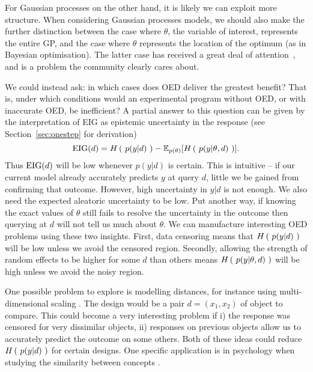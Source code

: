 For Gaussian processes on the other hand, it is likely we can exploit more structure. When considering Gaussian processes models, we should also make the further distinction between the case where $\theta$, the variable of interest, represents the entire GP, and the case where $\theta$ represents the location of the optimum (as in Bayesian optimisation). The latter case has received a great deal of attention~\cite{pes}, and is a problem the community clearly cares about.

We could instead ask: in which cases does OED deliver the greatest benefit? That is, under which conditions would an experimental program without OED, or with inaccurate OED, be inefficient? A partial answer to this question can be given by the interpretation of EIG as epistemic uncertainty in the response (see Section~\ref{sec:onestep} for derivation)
\begin{equation}
	\text{EIG}(d) = H\left(\ p(y|d)\ \right) - \mathbb{E}_{p(\theta)}[H\left(\ p(y|\theta,d)\ \right)].
\end{equation}
Thus $\text{EIG}(d)$ will be low whenever $p(y|d)$ is certain. This is intuitive -- if our current model already accurately predicts $y$ at query $d$, little we be gained from confirming that outcome. However, high uncertainty in $y|d$ is not enough. We also need the expected aleatoric uncertainty to be low. Put another way, if knowing the exact values of $\theta$ still fails to resolve the uncertainty in the outcome then querying at $d$ will not tell us much about $\theta$. We can manufacture interesting OED problems using these two insights. First, data censoring means that $H\left(\ p(y|d)\ \right)$ will be low unless we avoid the censored region. Secondly, allowing the strength of random effects to be higher for some $d$ than others means $H\left(\ p(y|\theta,d)\ \right)$ will be high unless we avoid the noisy region.

One possible problem to explore is modelling distances, for instance using multi-dimensional scaling \cite{torgerson1952multidimensional}. The design would be a pair $d = (x_1, x_2)$ of object to compare. This could become a very interesting problem if i) the response was censored for very dissimilar objects, ii) responses on previous objects allow us to accurately predict the outcome on some others. Both of these ideas could reduce $H\left(\ p(y|d)\ \right)$ for certain designs. One specific application is in psychology when studying the similarity between concepts \cite{shepard1962analysis}.

